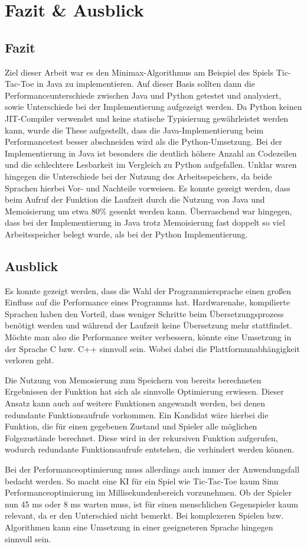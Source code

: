 \chapter{Fazit \& Ausblick}

\section{Fazit}
Ziel dieser Arbeit war es den Minimax-Algorithmus am Beispiel des Spiels Tic-Tac-Toe in Java zu implementieren. Auf dieser Basis 
sollten dann die Performanceunterschiede zwischen Java und Python getestet und analysiert, sowie Unterschiede bei der Implementierung 
aufgezeigt werden. Da Python keinen JIT-Compiler verwendet und keine statische Typisierung gewährleistet werden kann, wurde die These 
aufgestellt, dass die Java-Implementierung beim Performancetest besser abschneiden wird als die Python-Umsetzung. Bei der Implementierung 
in Java ist besonders die deutlich höhere Anzahl an Codezeilen und die schlechtere Lesbarkeit im Vergleich zu Python aufgefallen. 
Unklar waren hingegen die Unterschiede bei der Nutzung des Arbeitsspeichers, da beide Sprachen hierbei Vor- und Nachteile vorweisen. 
Es konnte gezeigt werden, dass beim Aufruf der  Funktion die Laufzeit durch die Nutzung von Java und Memoisierung um etwa 
80\% gesenkt werden kann. Überraschend war hingegen, dass bei der Implementierung in Java trotz Memoisierung fast doppelt so viel 
Arbeitsspeicher belegt wurde, als bei der Python Implementierung.


\section{Ausblick}
Es konnte gezeigt werden, dass die Wahl der Programmiersprache einen großen Einfluss auf die Performance eines Programms hat. 
Hardwarenahe, kompilierte Sprachen haben den Vorteil, dass weniger Schritte beim Übersetzungsprozess benötigt werden und während der Laufzeit 
keine Übersetzung mehr stattfindet. Möchte man also die Performance weiter verbessern, könnte eine Umsetzung in der Sprache C bzw. C++ sinnvoll 
sein. Wobei dabei die Plattformunabhängigkeit verloren geht. 

Die Nutzung von Memosierung zum Speichern von bereits berechneten Ergebnissen der  Funktion hat sich als sinnvolle 
Optimierung erwiesen. Dieser Ansatz kann auch auf weitere Funktionen angewandt werden, bei denen redundante Funktionsaufrufe vorkommen. 
Ein Kandidat wäre hierbei die  Funktion, die für einen gegebenen Zustand und Spieler alle möglichen Folgezustände berechnet. 
Diese wird in der rekursiven  Funktion aufgerufen, wodurch redundante Funktionsaufrufe entstehen, die verhindert werden können. 

Bei der Performanceoptimierung muss allerdings auch immer der Anwendungsfall bedacht werden. So macht eine KI für ein Spiel wie Tic-Tac-Toe 
kaum Sinn Performanceoptimierung im Millisekundenbereich vorzunehmen. Ob der Spieler nun 45 ms oder 8 ms warten muss, ist für einen menschlichen 
Gegenspieler kaum relevant, da er den Unterschied nicht bemerkt. Bei komplexeren Spielen bzw. Algorithmen kann eine Umsetzung in einer 
geeigneteren Sprache hingegen sinnvoll sein.